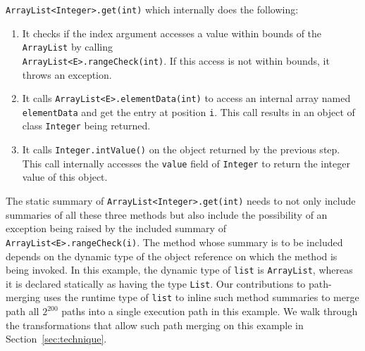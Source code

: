 {\tt ArrayList<Integer>.get(int)} which internally does the following:
%
\begin{enumerate}
\item It checks if the index argument accesses a value within bounds of the {\tt ArrayList} by calling\\
{\tt ArrayList<E>.rangeCheck(int)}. If this access is not within bounds, it throws an exception.
%
\item It calls {\tt ArrayList<E>.elementData(int)} to access an internal array named {\tt elementData} and get the
entry at position {\tt i}. This call results in an object of class {\tt Integer} being returned.
%
\item It calls {\tt Integer.intValue()} on the object returned by the previous step. This call internally accesses
the {\tt value} field of {\tt Integer} to return the integer value of this object.
%
\end{enumerate}

The static summary of {\tt ArrayList<Integer>.get(int)} needs to not only include summaries of all these three methods but
also include the possibility of an exception being raised by the included summary of {\tt ArrayList<E>.rangeCheck(i)}.
%
The method whose summary is to be included depends on the dynamic type of the object reference on which the method is being invoked.
%
In this example, the dynamic type of {\tt list} is {\tt ArrayList}, whereas it is declared statically as having the type {\tt List}.
%
Our contributions to path-merging uses the runtime type of {\tt list} to inline such method summaries to
merge path all $2^{200}$ paths into a single execution path in this example.
%
We  walk through the transformations that allow such path merging on this example in Section~\ref{sec:technique}.
